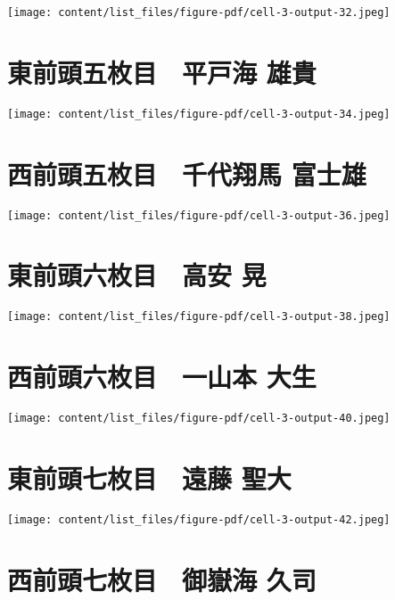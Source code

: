 \documentclass[
  letterpaper,
]{bxjsbook}
\begin{document}
\texttt{[image: content/list\_files/figure-pdf/cell-3-output-32.jpeg]}

\section{東前頭五枚目　平戸海
雄貴}\label{ux6771ux524dux982dux4e94ux679aux76ee-ux5e73ux6238ux6d77-ux96c4ux8cb4}

\texttt{[image: content/list\_files/figure-pdf/cell-3-output-34.jpeg]}

\section{西前頭五枚目　千代翔馬
富士雄}\label{ux897fux524dux982dux4e94ux679aux76ee-ux5343ux4ee3ux7fd4ux99ac-ux5bccux58ebux96c4}

\texttt{[image: content/list\_files/figure-pdf/cell-3-output-36.jpeg]}

\section{東前頭六枚目　高安
晃}\label{ux6771ux524dux982dux516dux679aux76ee-ux9ad8ux5b89-ux6643}

\texttt{[image: content/list\_files/figure-pdf/cell-3-output-38.jpeg]}

\section{西前頭六枚目　一山本
大生}\label{ux897fux524dux982dux516dux679aux76ee-ux4e00ux5c71ux672c-ux5927ux751f}

\texttt{[image: content/list\_files/figure-pdf/cell-3-output-40.jpeg]}

\section{東前頭七枚目　遠藤
聖大}\label{ux6771ux524dux982dux4e03ux679aux76ee-ux9060ux85e4-ux8056ux5927}

\texttt{[image: content/list\_files/figure-pdf/cell-3-output-42.jpeg]}

\section{西前頭七枚目　御嶽海
久司}\label{ux897fux524dux982dux4e03ux679aux76ee-ux5fa1ux5dbdux6d77-ux4e45ux53f8}
\end{document}
